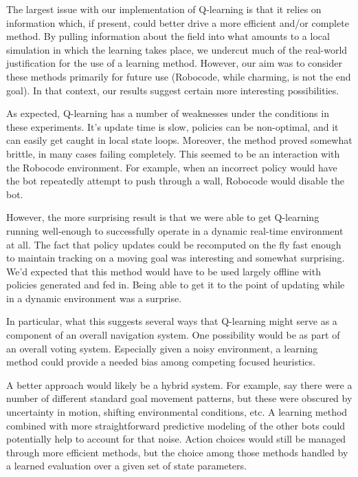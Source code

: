 \documentclass{aiaa-tc}%
\begin{document}
The largest issue with our implementation of Q-learning is that it
relies on information which, if present, could better drive a more
efficient and/or complete method. By pulling information about the
field into what amounts to a local simulation in which the learning
takes place, we undercut much of the real-world justification for the
use of a learning method. However, our aim was to consider these
methods primarily for future use (Robocode, while charming, is not the
end goal). In that context, our results suggest certain
more interesting possibilities.

As expected, Q-learning has a number of weaknesses under the conditions in these experiments. It's update time is
slow, policies can be non-optimal, and it can easily get caught in
local state loops. Moreover, the method proved somewhat brittle, in
many cases failing completely. This seemed to be an interaction with
the Robocode environment. For example, when an incorrect policy would
have the bot repeatedly attempt to push through a wall, Robocode would
disable the bot.

However, the more surprising
result is that we were able to get Q-learning running well-enough to
successfully operate in a dynamic real-time environment at all. The
fact that policy updates could be recomputed on the fly fast enough to
maintain tracking on a moving goal was interesting and somewhat
surprising. We'd expected that this method would have to be used
largely offline with policies generated and fed in. Being able to get
it to the point of updating while in a dynamic environment was a surprise.

In particular, what this suggests several ways that Q-learning might serve as a
component of an overall navigation system. One possibility would be as
part of an overall voting system. Especially given a noisy
environment, a learning method could provide a needed bias among
competing focused heuristics.

A better approach would likely be a hybrid system. For example, say
there were a number of different standard goal movement patterns, but
these were obscured by uncertainty in motion, shifting environmental
conditions, etc. A learning method combined with more straightforward
predictive modeling of the other bots could potentially help to
account for that noise. Action choices would still be managed through
more efficient methods, but the choice among those methods handled by
a learned evaluation over a given set of state parameters.
\end{document}
